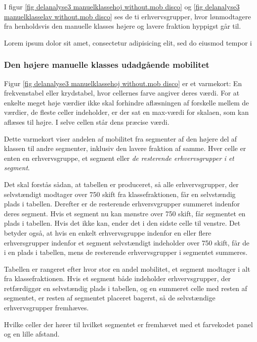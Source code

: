\begin{landscape}
I figur \ref{fig delanalyse3 manuelklassehoj without.mob disco} og \ref{fig delanalyse3 manuelklasselav without.mob disco} ses de ti erhvervsgrupper, hvor lønmodtagere fra henholdsvis den manuelle klasses højere og lavere fraktion hyppigst går til.

Lorem ipsum dolor sit amet, consectetur adipisicing elit, sed do eiusmod
tempor i


%
\subsubsection{Den højere manuelle klasses udadgående mobilitet}
%


Figur \ref{fig delanalyse3 manuelklassehoj without.mob disco} er et varmekort: En frekvenstabel eller krydstabel, hvor cellernes farve angiver deres værdi. For at enkelte meget høje værdier ikke skal forhindre aflæsningen af forskelle mellem de værdier, de fleste celler indeholder, er der sat en max-værdi for skalaen, som kan aflæses til højre. I selve cellen står dens præcise værdi. 

Dette varmekort viser andelen af mobilitet fra segmenter af den højere del af klassen til andre segmenter, inklusiv den lavere fraktion af samme. Hver celle er enten en erhvervsgruppe, et segment eller \emph{de resterende erhvervsgrupper i et segment}. 

Det skal forstås sådan, at tabellen er produceret, så alle erhvervsgrupper, der selvstændigt modtager over 750 skift fra klassefraktionen, får en selvstændig plads i tabellen. Derefter er de resterende erhversvgrupper summeret indenfor deres segment. Hvis et segment nu kan mønstre over 750 skift, får segmentet en plads i tabellen. Hvis det ikke kan, ender det i den sidste celle til venstre. Det betyder også, at hvis en enkelt erhvervsgruppe indenfor en eller flere erhversgrupper indenfor et segment selvstændigt indeholder over 750 skift, får de i en plads i tabellen, mens de resterende erhvervsgrupper i segmentet summeres. 

Tabellen er rangeret efter hvor stor en andel mobilitet, et segment modtager i alt fra klassefraktionen. Hvis et segment både indeholder erhvervsgrupper, der retfærdiggør en selvstændig plads i tabellen, og en summeret celle med resten af segmentet, er resten af segmentet placeret bagerst, så de selvstændige erhvervsgrupper fremhæves. 

Hvilke celler der hører til hvilket segmentet er fremhævet med et farvekodet panel og  en lille afstand.  


\end{landscape}
